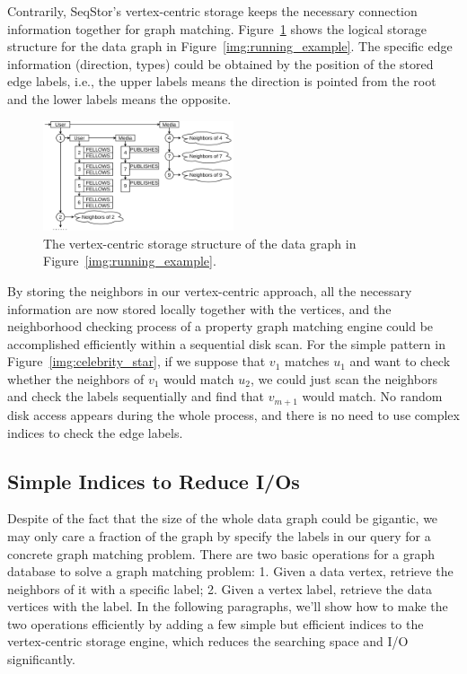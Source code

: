 Contrarily, SeqStor's vertex-centric storage keeps the necessary connection information together for graph matching.
Figure~\ref{img:data_example} shows the logical storage structure for the data graph in Figure~\ref{img:running_example}.
The specific edge information (direction, types) could be obtained by the position of the stored edge labels, i.e.,
the upper labels means the direction is pointed from the root and the lower labels means the opposite.

\begin{figure}[ht]
  \centering
  \includegraphics[width=0.5\textwidth]{img/data_example.pdf}
  \caption{The vertex-centric storage structure of the data graph in Figure~\ref{img:running_example}.}\label{img:data_example}
\end{figure}

By storing the neighbors in our vertex-centric approach,
all the necessary information are now stored locally together with the vertices,
and the neighborhood checking process of a property graph matching engine could be accomplished efficiently within a sequential disk scan.
For the simple pattern in Figure~\ref{img:celebrity_star}, if we suppose that $v_1$ matches $u_1$ and want to check whether the neighbors of $v_1$ would match $u_2$, we could just scan the neighbors and check the labels sequentially and find that $v_{m+1}$ would match.
No random disk access appears during the whole process, and there is no need to use complex indices to check the edge labels.
\subsection{Simple Indices to Reduce I/Os}
Despite of the fact that the size of the whole data graph could be gigantic,
we may only care a fraction of the graph by specify the labels in our query for a concrete graph matching problem.
There are two basic operations for a graph database to solve a graph matching problem:
1. Given a data vertex, retrieve the neighbors of it with a specific label;
2. Given a vertex label, retrieve the data vertices with the label.
In the following paragraphs, we'll show how to make the two operations efficiently by adding a few simple but efficient indices to the vertex-centric storage engine,
which reduces the searching space and I/O significantly.

